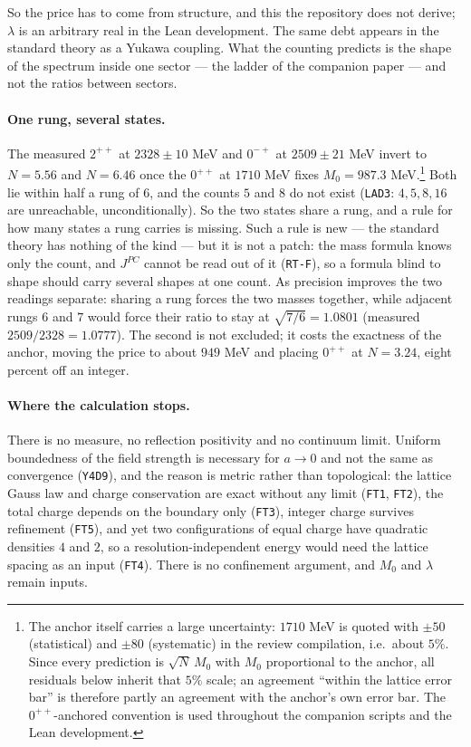 \documentclass[aps,prd,preprint,superscriptaddress,amsmath,amssymb]{revtex4-2}
\begin{document}
So the price has to come from structure, and this the repository does not
derive; $\lambda$ is an arbitrary real in the Lean development.  The same
debt appears in the standard theory as a Yukawa coupling.  What the counting
predicts is the shape of the spectrum inside one sector --- the ladder of the
companion paper --- and not the ratios between sectors.

\paragraph{One rung, several states.}
The measured $2^{++}$ at $2328\pm10$ MeV and $0^{-+}$ at $2509\pm21$ MeV
invert to $N=5.56$ and $N=6.46$ once the $0^{++}$ at $1710$ MeV fixes
$M_0=987.3$ MeV.\footnote{The anchor itself carries a large uncertainty:
$1710$ MeV is quoted with $\pm50$ (statistical) and $\pm80$ (systematic) in
the review compilation, i.e.\ about $5\%$.  Since every prediction is
$\sqrt N\,M_0$ with $M_0$ proportional to the anchor, all residuals below
inherit that $5\%$ scale; an agreement ``within the lattice error bar'' is
therefore partly an agreement with the anchor's own error bar.  The
$0^{++}$-anchored convention is used throughout the companion scripts and
the Lean development.}
Both lie within half a rung of $6$, and the counts $5$ and $8$ do not exist
(\texttt{LAD3}: $4,5,8,16$ are unreachable, unconditionally).  So the two
states share a rung, and a rule for how many states a rung carries is
missing.  Such a rule is new --- the standard theory has nothing of the kind
--- but it is not a patch: the mass formula knows only the count, and
$J^{PC}$ cannot be read out of it (\texttt{RT-F}), so a formula blind to
shape should carry several shapes at one count.  As precision improves the
two readings separate: sharing a rung forces the two masses together, while
adjacent rungs $6$ and $7$ would force their ratio to stay at
$\sqrt{7/6}=1.0801$ (measured $2509/2328=1.0777$).  The second is not
excluded; it costs the exactness of the anchor, moving the price to about
$949$ MeV and placing $0^{++}$ at $N=3.24$, eight percent off an integer.

\paragraph{Where the calculation stops.}
There is no measure, no reflection positivity and no continuum limit.  Uniform
boundedness of the field strength is necessary for $a\to0$ and not the same
as convergence (\texttt{Y4D9}), and the reason is metric rather than
topological: the lattice Gauss law and charge conservation are exact without
any limit (\texttt{FT1}, \texttt{FT2}), the total charge depends on the
boundary only (\texttt{FT3}), integer charge survives refinement
(\texttt{FT5}), and yet two configurations of equal charge have quadratic
densities $4$ and $2$, so a resolution-independent energy would need the
lattice spacing as an input (\texttt{FT4}).  There is no confinement
argument, and $M_0$ and $\lambda$ remain inputs.
\end{document}
